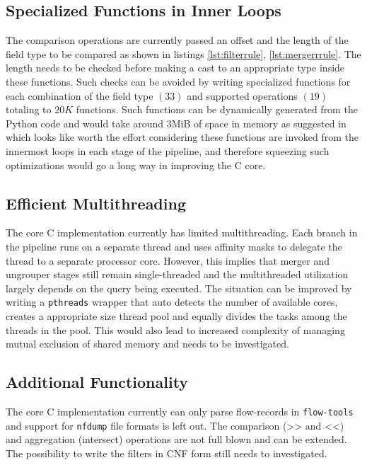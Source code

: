 \subsection{Specialized Functions in Inner Loops}\label{subsec:special-fns}
The comparison operations are currently passed an offset and the length of the field type to be compared as shown in listings \ref{lst:filterrule},  \ref{lst:mergerrrule}. The length needs to be checked before making a cast to an appropriate type inside these functions. Such checks can be avoided by writing specialized functions for each combination of the field type $(33)$ and supported operations $(19)$ totaling to $20K$ functions. Such functions can be dynamically generated from the Python code and would take around $3$MiB of space in memory as suggested in \cite{jschauer:thesis:2011} which looks like worth the effort considering these functions are invoked from the innermost loops in each stage of the pipeline, and therefore squeezing such optimizations would go a long way in improving the C core.

\subsection{Efficient Multithreading}\label{subsec:multithreading}
The core C implementation currently has limited multithreading. Each branch in the pipeline runs on a separate thread and uses affinity masks to delegate the thread to a separate processor core. However, this implies that merger and ungrouper stages still remain single-threaded and the multithreaded utilization largely depends on the query being executed. The situation can be improved by writing a \texttt{pthreads} wrapper that auto detects the number of available cores, creates a appropriate size thread pool and equally divides the tasks among the threads in the pool. This would also lead to increased complexity of managing mutual exclusion of shared memory and needs to be investigated.

\subsection{Additional Functionality}\label{subsec:additional-functionality}
The core C implementation currently can only parse flow-records in \texttt{flow-tools} and support for \texttt{nfdump} file formats is left out. The comparison (>> and <<) and aggregation (intersect) operations are not full blown and can be extended. The possibility to write the filters in \ac{CNF} form still needs to investigated.
